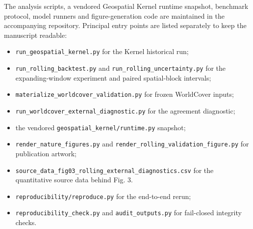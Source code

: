 The analysis scripts, a vendored Geospatial Kernel runtime snapshot,
benchmark protocol, model runners and figure-generation code are
maintained in the accompanying repository. Principal entry points are
listed separately to keep the manuscript readable:

\begin{itemize}
\tightlist
\item
  \texttt{run\_geospatial\_kernel.py} for the Kernel historical run;
\item
  \texttt{run\_rolling\_backtest.py} and
  \texttt{run\_rolling\_uncertainty.py} for the expanding-window
  experiment and paired spatial-block intervals;
\item
  \texttt{materialize\_worldcover\_validation.py} for frozen WorldCover
  inputs;
\item
  \texttt{run\_worldcover\_external\_diagnostic.py} for the agreement
  diagnostic;
\item
  the vendored \texttt{geospatial\_kernel/runtime.py} snapshot;
\item
  \texttt{render\_nature\_figures.py} and
  \texttt{render\_rolling\_validation\_figure.py} for publication
  artwork;
\item
  \texttt{source\_data\_fig03\_rolling\_external\_diagnostics.csv} for
  the quantitative source data behind Fig. 3.
\item
  \texttt{reproducibility/reproduce.py} for the end-to-end rerun;
\item
  \texttt{reproducibility\_check.py} and \texttt{audit\_outputs.py} for
  fail-closed integrity checks.
\end{itemize}

